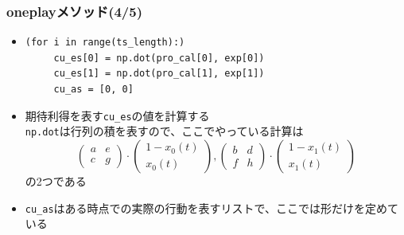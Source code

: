 \documentclass[dvipdfmx,fleqn]{beamer}
\begin{document}
\begin{frame}[fragile]%
\frametitle{oneplayメソッド(4/5)}
\begin{itemize}\setlength{\parskip}{0.5em}
\item
\footnotesize
\begin{verbatim}   
(for i in range(ts_length):)
     cu_es[0] = np.dot(pro_cal[0], exp[0])
     cu_es[1] = np.dot(pro_cal[1], exp[1])
     cu_as = [0, 0]
\end{verbatim}\pause
\normalsize
\item
期待利得を表す\verb|cu_es|の値を計算する\pause\\
\verb|np.dot|は行列の積を表すので、ここでやっている計算は
\footnotesize
\begin{equation*}
\begin{pmatrix}
a & e\\
c & g
\end{pmatrix}\cdot
\begin{pmatrix}
1-x_0(t) \\
x_0(t)
\end{pmatrix}
, 
\begin{pmatrix}
b & d\\
f & h
\end{pmatrix}\cdot
\begin{pmatrix}
1-x_1(t)\\
x_1(t)
\end{pmatrix}
\end{equation*}
\normalsize
の2つである\pause
\item
\verb|cu_as|はある時点での実際の行動を表すリストで、ここでは形だけを定めている
\end{itemize}
\end{frame}
\end{document}
